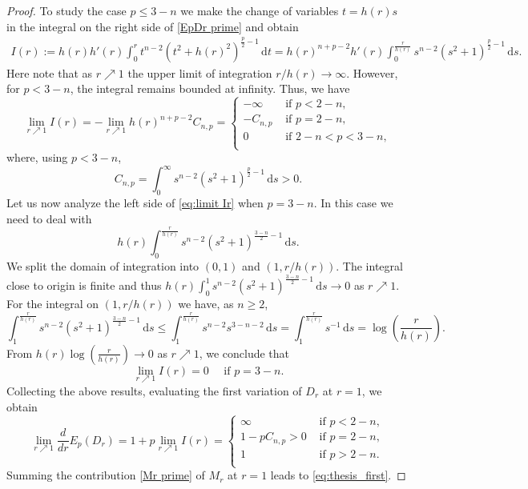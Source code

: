 \documentclass[10pt,leqno]{amsart}
\newcommand{\dd}{\, \mathrm{d}}
\numberwithin{Theorem}{section}
\theoremstyle{definition}
\theoremstyle{remark}
\numberwithin{equation}{section}
\numberwithin{equation}{section}
\begin{document}
\begin{proof}
To study the case $p\leq 3-n$ we make the change of variables $t=h(r) s$ in the integral on the right side of \eqref{EpDr prime} and obtain
\begin{align*}
    I(r):= h(r)h'(r) \int_0^r t^{n-2}(t^2+h(r)^2)^{\frac{p}{2}-1}   \dd t = h(r)^{n+p-2}h'(r) \int_0^{\frac{r}{h(r)}} s^{n-2}(s^2+1)^{\frac{p}{2}-1}   \dd s. 
\end{align*}
Here note that as $r \nearrow 1$ the upper limit of integration $r/h(r) \to \infty$. However, for $p <3-n$, the integral remains bounded at infinity. Thus, we have
\begin{equation}\label{eq:limit Ir}
    \lim_{r \nearrow 1} I(r) =- \lim_{r \nearrow 1}  h(r)^{n+p-2} C_{n,p}=\begin{cases} -\infty & \text{ if } p<2-n, \\
    -C_{n,p} & \text{ if } p = 2-n, \\
     0 & \text{ if } 2-n < p < 3-n, \\
    \end{cases}
\end{equation}
where, using $p<3-n$, 
\[
C_{n,p}=\int_0^{\infty} s^{n-2}(s^2+1)^{\frac{p}{2}-1}   \dd s >0.
\]
Let us now analyze the left side of \eqref{eq:limit Ir} when $p=3-n$. In this case we need to deal with 
\[
h(r)\int_0^{\frac{r}{h(r)}} s^{n-2}(s^2+1)^{\frac{3-n}{2}-1}   \dd s.
\]
We split the domain of integration into $(0,1)$ and $(1,r/h(r)).$ 
The integral close to origin is finite and thus $h(r) \int_0^{1} s^{n-2}(s^2+1)^{\frac{3-n}{2}-1}   \dd s \to 0$ as $r \nearrow 1$. For the integral on $(1,r/h(r))$ we have, as $n\geq 2$, 
\[
\int_1^{\frac{r}{h(r)}} s^{n-2}(s^2+1)^{\frac{3-n}{2}-1}   \dd s \leq  \int_1^{\frac{r}{h(r)}} s^{n-2}s^{3-n-2}   \dd s = \int_1^{\frac{r}{h(r)}}s^{-1}\dd s =  \log \left( \frac{r}{h(r)}\right).
\]
From  $h(r)\log \left( \frac{r}{h(r)}\right) \to 0$ as $r \nearrow 1$, we conclude that 
$$
  \lim_{r\nearrow 1}I(r)=0\quad\text{ if } p=3-n.
$$
Collecting the above results, evaluating the first variation of $D_r$ at $r=1$, we obtain
\begin{equation*}
      \lim_{r\nearrow 1} \frac{d}{dr} E_p( D_r)  =  1 + p \lim_{r \nearrow 1} I(r)= \begin{cases}
          \infty   & \text{ if } p<2-n, \\
     1 -p  C_{n,p} >0 & \text{ if } p = 2-n, \\
     1& \text{ if } p>2-n. \\
      \end{cases}
\end{equation*}
Summing the contribution \eqref{Mr prime} of $M_r$ at $r=1$ leads to \eqref{eq:thesis_first}.


\end{proof}
\end{document}
